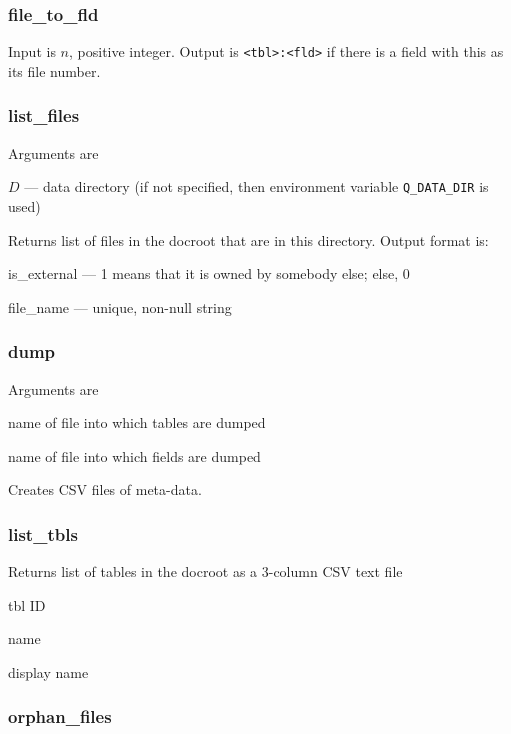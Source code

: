 \documentclass{report}
\begin{document}
\subsubsection{file\_to\_fld}
\label{file_to_fld}

Input is \(n\), positive integer. Output is \verb+<tbl>:<fld>+ if there
is a field with this as its file number.

\subsubsection{list\_files}
\label{list_files}

Arguments are
\be
\item \(D\) --- data directory (if not specified, then environment
    variable \verb+Q_DATA_DIR+ is used)
\ee

Returns list of files in the docroot that are in this directory. Output
format is:
\be
\item is\_external --- 1 means that it is owned by somebody else; else, 0
\item file\_name  --- unique, non-null string
\ee

\subsubsection{dump}
\label{dump}

Arguments are
\be
\item name of file into which tables are dumped
\item name of file into which fields are dumped
\ee

Creates CSV files of meta-data.

\subsubsection{list\_tbls}
\label{list_tbls}

Returns list of tables in the docroot as a 3-column CSV text file
\be
\item  tbl ID
\item name
\item display name
\ee

\subsubsection{orphan\_files}
\label{orphan_files}
\end{document}
